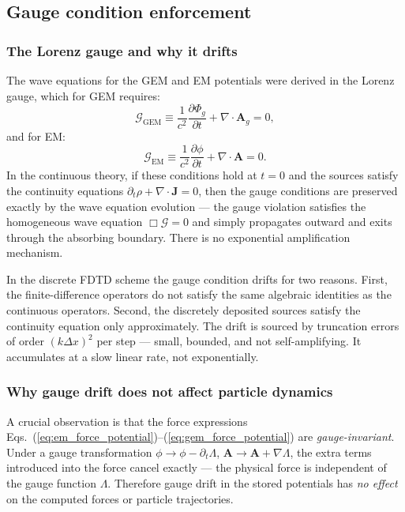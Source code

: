 \documentclass[11pt,a4paper]{article}
\newcommand{\vv}[1]{\mathbf{#1}}
\newcommand{\Phig}{\Phi_g}
\newcommand{\Ag}{\vv{A}_g}
\begin{document}
\subsection{Gauge condition enforcement}
\label{sec:gauge}

\subsubsection*{The Lorenz gauge and why it drifts}

The wave equations for the GEM and EM potentials were derived in the Lorenz gauge, which for GEM requires:
\begin{equation}
\label{eq:lorenz_gem}
  \mathcal{G}_{\mathrm{GEM}} \equiv \frac{1}{c^2}\frac{\partial\Phig}{\partial t} + \nabla\cdot\Ag = 0,
\end{equation}
and for EM:
\begin{equation}
\label{eq:lorenz_em}
  \mathcal{G}_{\mathrm{EM}} \equiv \frac{1}{c^2}\frac{\partial\phi}{\partial t} + \nabla\cdot\vv{A} = 0.
\end{equation}
In the continuous theory, if these conditions hold at $t=0$ and the sources satisfy the continuity equations $\partial_t\rho + \nabla\cdot\vv{J} = 0$, then the gauge conditions are preserved exactly by the wave equation evolution --- the gauge violation satisfies the homogeneous wave equation $\Box\mathcal{G} = 0$ and simply propagates outward and exits through the absorbing boundary.  There is no exponential amplification mechanism.

In the discrete FDTD scheme the gauge condition drifts for two reasons.  First, the finite-difference operators do not satisfy the same algebraic identities as the continuous operators.  Second, the discretely deposited sources satisfy the continuity equation only approximately.  The drift is sourced by truncation errors of order $(k\Delta x)^2$ per step --- small, bounded, and not self-amplifying.  It accumulates at a slow linear rate, not exponentially.

\subsubsection*{Why gauge drift does not affect particle dynamics}

A crucial observation is that the force expressions Eqs.~(\ref{eq:em_force_potential})--(\ref{eq:gem_force_potential}) are \emph{gauge-invariant}.  Under a gauge transformation $\phi\to\phi-\partial_t\Lambda$, $\vv{A}\to\vv{A}+\nabla\Lambda$, the extra terms introduced into the force cancel exactly --- the physical force is independent of the gauge function $\Lambda$.  Therefore gauge drift in the stored potentials has \emph{no effect} on the computed forces or particle trajectories.
\end{document}

